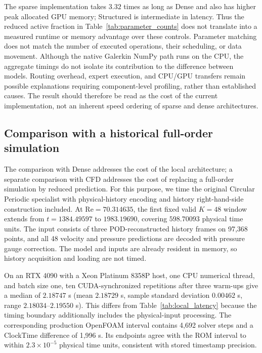 The sparse implementation takes $3.32$ times as long as Dense and also
has higher peak allocated GPU memory; Structured is intermediate in
latency. Thus the reduced active fraction in
Table~\ref{tab:parameter_counts} does not translate into a measured
runtime or memory advantage over these controls. Parameter matching
does not match the number of executed operations, their scheduling,
or data movement. Although the native Galerkin NumPy path runs on the
CPU, the aggregate timings do not isolate its contribution to the
difference between models. Routing overhead, expert execution, and
CPU/GPU transfers remain possible explanations requiring component-level
profiling, rather than established causes. The result should therefore
be read as the cost of the current implementation, not an inherent
speed ordering of sparse and dense architectures.

\subsection{Comparison with a historical full-order simulation}
\label{app:cost_fom_reference}

The comparison with Dense addresses the cost of the local architecture;
a separate comparison with CFD addresses the cost of replacing a
full-order simulation by reduced prediction. For this purpose, we time
the original Circular Periodic specialist with physical-history encoding
and history right-hand-side construction included. At
$\mathrm{Re}=70.314635$, the first fixed valid $K=48$ window extends
from $t=1384.49597$ to $1983.19690$, covering $598.70093$ physical time
units. The input consists of three POD-reconstructed history frames on
97,368 points, and all 48 velocity and pressure predictions are decoded
with pressure gauge correction. The model and inputs are already
resident in memory, so history acquisition and loading are not timed.

On an RTX 4090 with a Xeon Platinum 8358P host, one CPU numerical
thread, and batch size one, ten CUDA-synchronized repetitions after
three warm-ups give a median of $2.18747$ s (mean $2.18729$ s, sample
standard deviation $0.00462$ s, range $2.18034$--$2.19550$ s).
This differs from Table~\ref{tab:local_latency} because the timing
boundary additionally includes the physical-input processing.
The corresponding production OpenFOAM interval contains 4,692 solver
steps and a ClockTime difference of 1,996 s. Its endpoints agree with
the ROM interval to within $2.3\times10^{-5}$ physical time units,
consistent with stored timestamp precision.

